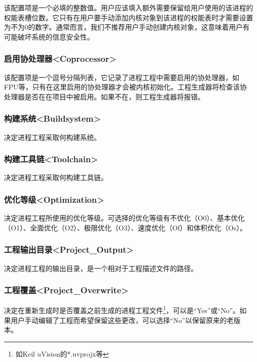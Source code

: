 该配置项是一个必填的整数值。用户应该填入额外需要保留给用户使用的该进程的权能表槽位数。它只有在用户要手动添加内核对象到该进程的权能表时才需要设置为不为0的数字。通常而言，我们不推荐用户手动创建内核对象，这意味着用户有可能破坏系统的信息安全性。

\subsubsection{启用协处理器<Coprocessor>{}}\label{subsubsec:5-3-14-3}

该配置项是一个逗号分隔列表，它记录了进程工程中需要启用的协处理器，如FPU等，只有在这里启用的协处理器才会被内核初始化。工程生成器将检查该协处理器是否在在项目中被启用。如果不在，则工程生成器将报错。

\subsubsection{构建系统<Buildsystem>{}}\label{subsubsec:5-3-14-4}

决定进程工程采取何构建系统。

\subsubsection{构建工具链<Toolchain>{}}\label{subsubsec:5-3-14-5}

决定进程工程采取何构建工具链。

\subsubsection{优化等级<Optimization>{}}\label{subsubsec:5-3-14-6}

决定进程工程所使用的优化等级。可选择的优化等级有不优化（O0）、基本优化（O1）、全面优化（O2）、极限优化（O3）、速度优化（Of）和体积优化（Os）。

\subsubsection{工程输出目录<Project\_Output>{}}\label{subsubsec:5-3-14-7}

决定进程工程的输出目录，是一个相对于工程描述文件的路径。

\subsubsection{工程覆盖<Project\_Overwrite>{}}\label{subsubsec:5-3-14-8}

决定在重新生成时是否覆盖之前生成的进程工程文件\footnote{如Keil uVision的*.uvprojx等}，可以是``Yes''或``No''。如果用户手动编辑了工程而希望保留这些更改，可以选择``No''以保留原来的老版本。

